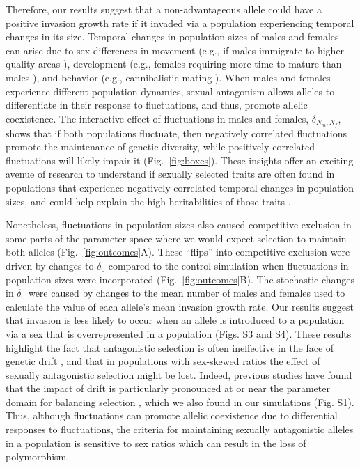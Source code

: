 Therefore, our results suggest that a non-advantageous allele could have a positive invasion growth rate if it invaded via a population experiencing temporal changes in its size.  Temporal changes in population sizes of males and females can arise due to sex differences in movement (e.g., if males immigrate to higher quality areas \citep{matter2002experimental}), development (e.g., females requiring more time to mature than males \citep{kasumovic2008spatial}), and behavior (e.g., cannibalistic mating \citep{elgar2003male}). When males and females experience different population dynamics, sexual antagonism allows alleles to differentiate in their response to fluctuations, and thus, promote allelic coexistence. The interactive effect of fluctuations in males and females, $\delta_{N_{m},N_{f}}$, shows that if both populations fluctuate, then negatively correlated fluctuations promote the maintenance of genetic diversity, while positively correlated fluctuations will likely impair it  (Fig.~\ref{fig:boxes}). These insights offer an exciting avenue of research to understand if sexually selected traits are often found in populations that experience negatively correlated temporal changes in population sizes, and could help explain the high heritabilities of those traits \citep{reinhold2000maintenance}.


Nonetheless, fluctuations in population sizes also caused competitive exclusion in some parts of the parameter space where we would expect selection to maintain both alleles (Fig.~\ref{fig:outcomes}A). These ``flips'' into competitive exclusion were driven by changes to $\delta_{0}$ compared to the control simulation when fluctuations in population sizes were incorporated (Fig.~\ref{fig:outcomes}B). The stochastic changes in $\delta_{0}$ were caused by changes to the mean number of males and females used to calculate the value of each allele's mean invasion growth rate. Our results suggest that invasion is less likely to occur when an allele is introduced to a population via a sex that is overrepresented in a population (Figs. S3 and S4).  These results highlight the fact that antagonistic selection is often ineffective in the face of genetic drift \citep{connallon2012general}, and that in populations with sex-skewed ratios the effect of sexually antagonistic selection might be lost. Indeed, previous studies have found that the impact of drift is particularly pronounced at or near the parameter domain for balancing selection \citep{connallon2012general}, which we also found in our simulations (Fig. S1). Thus, although fluctuations can promote allelic coexistence due to differential responses to fluctuations, the criteria for maintaining sexually antagonistic alleles in a population is sensitive to sex ratios which can result in the loss of polymorphism.


